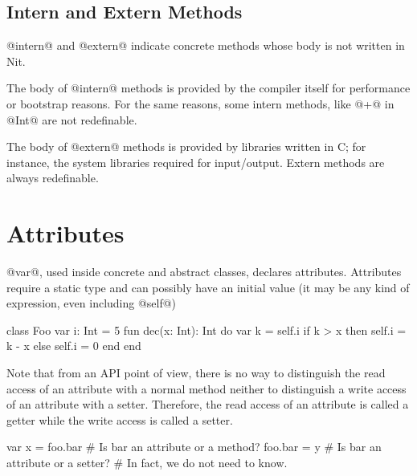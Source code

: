 \subsection{Intern and Extern Methods}\label{intern}\label{extern}

@intern@ and @extern@ indicate concrete methods whose body is not written in Nit.

The body of @intern@ methods is provided by the compiler itself for performance or bootstrap reasons.
For the same reasons, some intern methods, like @+@ in @Int@ are not redefinable.

The body of @extern@ methods is provided by libraries written in C; for instance, the system libraries required for input/output.
Extern methods are always redefinable.

\section{Attributes}\label{attribute}\label{writable}

@var@, used inside concrete and abstract classes, declares attributes.
Attributes require a static type and can possibly have an initial value (it may be any kind of expression, even including @self@)


\begin{lst}
class Foo
	var i: Int = 5
	fun dec(x: Int): Int
	do
		var k = self.i
		if k > x then self.i = k - x else self.i = 0
	end
end
\end{lst}

Note that from an API point of view, there is no way to distinguish the read access of an attribute with a normal method neither to distinguish a write access of an attribute with a setter.
Therefore, the read access of an attribute is called a getter while the write access is called a setter.
\begin{lst}
var x = foo.bar # Is bar an attribute or a method?
foo.bar = y # Is bar an attribute or a setter?
# In fact, we do not need to know.
\end{lst}

